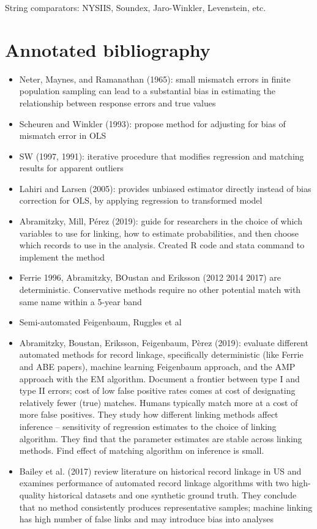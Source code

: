 \documentclass[12pt]{article}
\begin{document}
String comparators: NYSIIS, Soundex, Jaro-Winkler, Levenstein, etc. 




\section{Annotated bibliography}
\begin{itemize}
\item Neter, Maynes, and Ramanathan (1965): small mismatch errors in finite population sampling can lead to a substantial bias in estimating the relationship between response errors and true values
\item Scheuren and Winkler (1993): propose method for adjusting for bias of mismatch error in OLS
\item SW (1997, 1991): iterative procedure that modifies regression and matching results for apparent outliers 
\item Lahiri and Larsen (2005):   provides unbiased estimator directly instead of bias correction for OLS, by applying regression to transformed model 
\item Abramitzky, Mill, P\'erez (2019): guide for researchers in the choice of which variables to use for linking, how to estimate probabilities, and then choose which records to use in the analysis.  Created R code and stata command to implement the method
\item Ferrie 1996, Abramitzky, BOustan and Eriksson (2012 2014 2017) are deterministic.  Conservative methods require no other potential match with same name within a 5-year band
\item Semi-automated Feigenbaum, Ruggles et al 
\item Abramitzky, Boustan, Eriksson, Feigenbaum, P\`erez (2019): evaluate different automated methods for record linkage, specifically deterministic (like Ferrie and ABE papers), machine learning Feigenbaum approach, and the AMP approach with the EM algorithm.  Document a frontier between type I and type II errors; cost of low false positive rates comes at cost of designating relatively fewer (true) matches.  Humans typically match more at a cost of more false positives.  They study how different linking methods affect inference -- sensitivity of regression estimates to the choice of linking algorithm.  They find that the parameter estimates are stable across linking methods.  Find effect of matching algorithm on inference is small. 
\item Bailey et al. (2017) review literature on historical record linkage in US and examines performance of automated record linkage algorithms with two high-quality historical datasets and one synthetic ground truth.  They conclude that no method consistently produces representative samples; machine linking has high number of false links and may introduce bias into analyses

\end{itemize}
\end{document}
